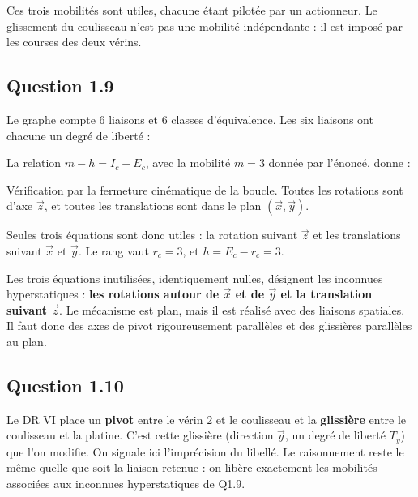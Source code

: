 \documentclass[11pt,a4paper]{article}
\newcommand{\equationajustee}[1]{%
  \sbox{\boiteequation}{$\displaystyle #1$}%
  \ifdim\wd\boiteequation>\linewidth
    \[\resizebox{\linewidth}{!}{\usebox{\boiteequation}}\]%
  \else
    \[#1\]%
  \fi}
\begin{document}
Ces trois mobilités sont utiles, chacune étant pilotée par un actionneur. Le glissement du coulisseau n'est pas une mobilité indépendante : il est imposé par les courses des deux vérins.

\hypertarget{question-1.9}{%
\subsection{Question 1.9}\label{question-1.9}}

Le graphe compte 6 liaisons et 6 classes d'équivalence. Les six liaisons ont chacune un degré de liberté :

\equationajustee{\begin{aligned}
\gamma &= L - N + 1 \\
&= 6 - 6 + 1 = 1 \\
E_c &= 6\,\gamma = 6 \\
I_c &= 6
\end{aligned}}

La relation \(m - h = I_c - E_c\), avec la mobilité \(m = 3\) donnée par l'énoncé, donne :

\equationajustee{\begin{aligned}
h &= m - I_c + E_c \\
&= 3 - 6 + 6
\end{aligned}}

\equationajustee{\boxed{h = 3}}

Vérification par la fermeture cinématique de la boucle. Toutes les rotations sont d'axe \(\vec z\), et toutes les translations sont dans le plan \((\vec x,\vec y)\).

Seules trois équations sont donc utiles : la rotation suivant \(\vec z\) et les translations suivant \(\vec x\) et \(\vec y\). Le rang vaut \(r_c = 3\), et \(h = E_c - r_c = 3\).

Les trois équations inutilisées, identiquement nulles, désignent les inconnues hyperstatiques : \textbf{les rotations autour de \(\vec x\) et de \(\vec y\) et la translation suivant \(\vec z\)}. Le mécanisme est plan, mais il est réalisé avec des liaisons spatiales. Il faut donc des axes de pivot rigoureusement parallèles et des glissières parallèles au plan.

\hypertarget{question-1.10}{%
\subsection{Question 1.10}\label{question-1.10}}

Le DR VI place un \textbf{pivot} entre le vérin 2 et le coulisseau et la \textbf{glissière} entre le coulisseau et la platine. C'est cette glissière (direction \(\vec y\), un degré de liberté \(T_y\)) que l'on modifie. On signale ici l'imprécision du libellé. Le raisonnement reste le même quelle que soit la liaison retenue : on libère exactement les mobilités associées aux inconnues hyperstatiques de Q1.9.
\end{document}
